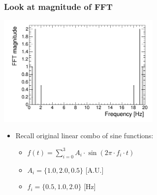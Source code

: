\documentclass[bigger]{beamer}
\begin{document}
\begin{frame}
\frametitle{Look at magnitude of FFT}
\label{sec-2-1-2}
\label{sec-2-1-2-1}

\centering
\includegraphics[width=0.6\textwidth]{fig/tutorial_FFT_magnitude.png}
\begin{itemize}

\item Recall original linear combo of sine functions:
\label{sec-2-1-2-2}%
\begin{itemize}

\item \(f(t) = \sum_{i = 0}^3 A_{i} \cdot \sin (2\pi \cdot f_{i} \cdot t)\)
\label{sec-2-1-2-2-1}%

\item \(A_{i} = \{1.0, 2.0, 0.5\}\) [A.U.]
\label{sec-2-1-2-2-2}%

\item \(f_{i} = \{0.5, 1.0, 2.0\}\) [Hz]
\label{sec-2-1-2-2-3}%
\end{itemize} %
\end{itemize} %
\end{frame}
\end{document}
